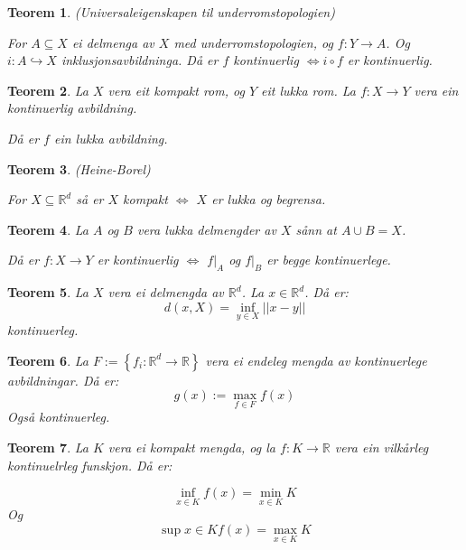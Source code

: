 \documentclass[a4paper, 12pt, norsk]{article}
\theoremstyle{plain}
\newtheorem{theorem}{Teorem}[section]
\theoremstyle{definition}
\newcommand{\Rb}{\mathbb{R}}
\newcommand{\union}{ \mathop{\cup}\limits }
\newcommand{\set}[1]{ \left \{ #1 \right \} } %
\begin{document}
\begin{theorem} \label{thm:universal-eigenskap-underromstopologi}
	(Universaleigenskapen til underromstopologien)

	For \( A \subseteq X \) ei delmenga av \( X \) med underromstopologien, og \( f: Y \to A \). Og \( i: A \hookrightarrow X \) inklusjonsavbildninga. Då er \( f \) kontinuerlig  \( \iff i \circ f \) er kontinuerlig.
\end{theorem}

\begin{theorem} \label{thm:closed-map-lemma}
	La \( X \) vera eit kompakt rom, og \( Y \) eit lukka rom. La \( f: X \to Y \) vera ein kontinuerlig avbildning.

	Då er \( f \) ein lukka avbildning.
\end{theorem}

\begin{theorem} \label{thm:heine-borel}
	(Heine-Borel)

	For \( X \subseteq \Rb^d \) så er \( X \) kompakt \( \iff \) \( X \) er lukka og begrensa.
\end{theorem}

\begin{theorem} \label{thm:pasting-lemma}
	La \( A \) og \( B \) vera lukka delmengder av \( X \) sånn at \( A \union B = X \). 
	
	Då er \( f: X \to Y \) er kontinuerlig \( \iff \) \( f|_A \) og \( f|_B \) er begge kontinuerlege.
\end{theorem}

\begin{theorem} \label{thm:distanse-er-kont}
	La \( X \) vera ei delmengda av \( \Rb^d \). La \( x \in \Rb^d \). Då er:
	\[
		d(x, X) = \inf_{y \in X} ||x-y||
	\]
	kontinuerleg.
\end{theorem}

\begin{theorem} \label{thm:maksimum-av-kont-er-kont}
	La \( F := \set{f_i : \Rb^d \to \Rb} \) vera ei endeleg mengda av kontinuerlege avbildningar. Då er:
	\[
		g(x) := \max_{f \in F} f(x)
	\]
	Også kontinuerleg.
\end{theorem}

\begin{theorem} \label{thm:infimum-over-kompakt-er-min} \label{thm:supremum-over-kompakt-er-maks}
	La \( K \) vera ei kompakt mengda, og la \( f: K \to \Rb \) vera ein vilkårleg kontinuelrleg funskjon. Då er:

	\[
		\inf_{x \in K} f(x) = \min_{x \in K} K
	\]
	Og
	\[
		\sup{x \in K} f(x) = \max_{x \in K} K
	\]
\end{theorem}
\end{document}
